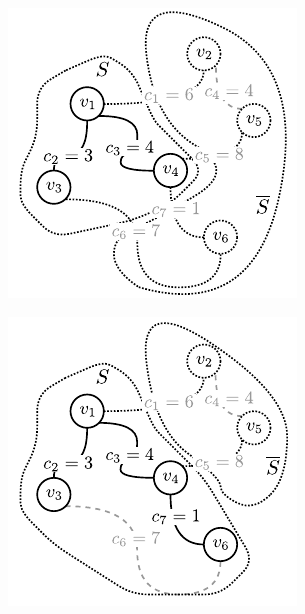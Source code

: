 \begin{figure}[!htbp]
\begin{subfigure}[b]{0.29\textwidth}
		\caption{}
		\label{fig:prime:b}
	\end{subfigure}
	\hfill
	\begin{subfigure}[b]{0.29\textwidth}
		\includegraphics[width=\textwidth]{Chapter_I/PRIME-example/c}
		\caption{}
		\label{fig:prime:c}
	\end{subfigure}
	\hfill
	\begin{subfigure}[b]{0.29\textwidth}
		\includegraphics[width=\textwidth]{Chapter_I/PRIME-example/d}

\end{subfigure}
\end{figure}
